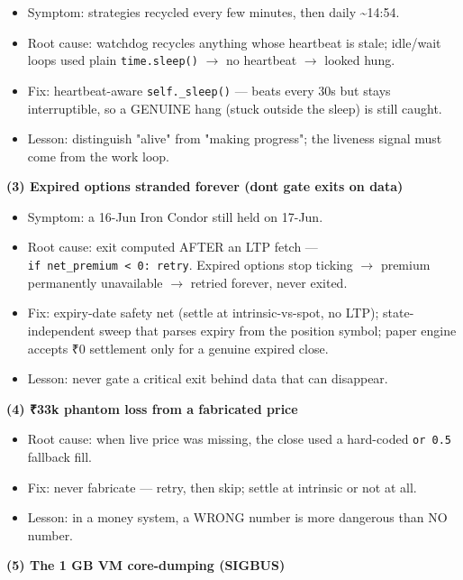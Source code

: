 \documentclass[11pt]{article}
\providecommand{\tightlist}{\setlength{\itemsep}{1pt}\setlength{\parskip}{0pt}}
\begin{document}
\begin{itemize}
\tightlist
\item
  Symptom: strategies recycled every few minutes, then daily \textasciitilde14:54.
\item
  Root cause: watchdog recycles anything whose heartbeat is stale; idle/wait loops used plain \texttt{time.sleep()} \(\rightarrow\) no heartbeat \(\rightarrow\) looked hung.
\item
  Fix: heartbeat-aware \texttt{self.\_sleep()} --- beats every 30s but stays interruptible, so a GENUINE hang (stuck outside the sleep) is still caught.
\item
  Lesson: distinguish "alive" from "making progress"; the liveness signal must come from the work loop.
\end{itemize}

\textbf{(3) Expired options stranded forever (don\textquotesingle t gate exits on data)}

\begin{itemize}
\tightlist
\item
  Symptom: a 16-Jun Iron Condor still held on 17-Jun.
\item
  Root cause: exit computed AFTER an LTP fetch --- \texttt{if\ net\_premium\ \textless{}\ 0:\ retry}. Expired options stop ticking \(\rightarrow\) premium permanently unavailable \(\rightarrow\) retried forever, never exited.
\item
  Fix: expiry-date safety net (settle at intrinsic-vs-spot, no LTP); state-independent sweep that parses expiry from the position symbol; paper engine accepts ₹0 settlement only for a genuine expired close.
\item
  Lesson: never gate a critical exit behind data that can disappear.
\end{itemize}

\textbf{(4) ₹33k phantom loss from a fabricated price}

\begin{itemize}
\tightlist
\item
  Root cause: when live price was missing, the close used a hard-coded \texttt{or\ 0.5} fallback fill.
\item
  Fix: never fabricate --- retry, then skip; settle at intrinsic or not at all.
\item
  Lesson: in a money system, a WRONG number is more dangerous than NO number.
\end{itemize}

\textbf{(5) The 1 GB VM core-dumping (SIGBUS)}
\end{document}
